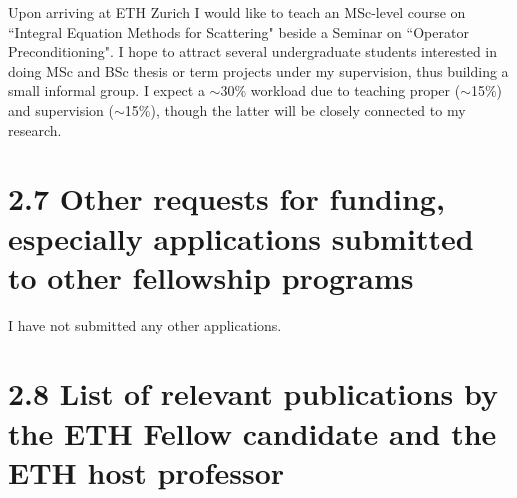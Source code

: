 \documentclass[]{report}
\begin{document}
Upon arriving at ETH Zurich I would like to teach an MSc-level course on ``Integral
Equation Methods for Scattering" beside a Seminar on ``Operator Preconditioning". I hope to attract several undergraduate students interested in doing MSc and BSc thesis or term projects under my supervision, thus building a small informal group. I expect a $\sim$30\% workload due to teaching proper ($\sim$15\%) and supervision ($\sim$15\%), though the latter will be closely connected to my research.

\section*{2.7 Other requests for funding, especially applications submitted to other fellowship programs}

I have not submitted any other applications.

\section*{2.8 List of relevant publications by the ETH Fellow candidate and the ETH host professor}
\bgroup
\renewcommand{\chapter}[2]{}%
\end{document}
